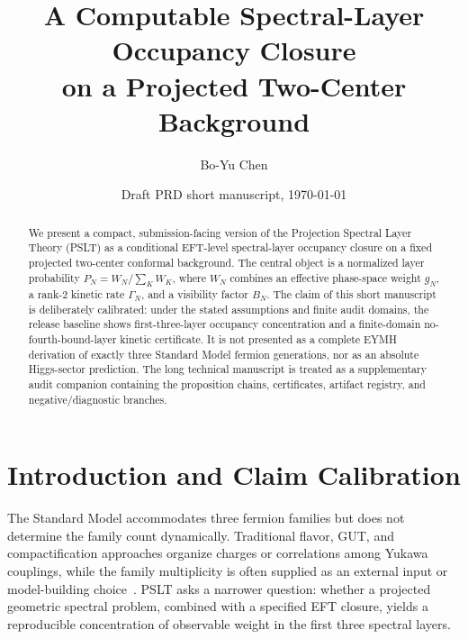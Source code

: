 \documentclass[aps,prd,onecolumn,notitlepage,nofootinbib,superscriptaddress,11pt,floatfix]{revtex4-2}
\begin{document}
\title{\Large\bf \texorpdfstring{A Computable Spectral-Layer Occupancy Closure\\ on a Projected Two-Center Background}{A Computable Spectral-Layer Occupancy Closure on a Projected Two-Center Background}}

\author{Bo-Yu Chen}

\date{Draft PRD short manuscript, \today}

\begin{abstract}
We present a compact, submission-facing version of the Projection Spectral Layer Theory (PSLT) as a conditional EFT-level spectral-layer occupancy closure on a fixed projected two-center conformal background.
The central object is a normalized layer probability
\(P_N=W_N/\sum_K W_K\), where \(W_N\) combines an effective phase-space weight \(g_N\), a rank-2 kinetic rate \(\Gamma_N\), and a visibility factor \(B_N\).
The claim of this short manuscript is deliberately calibrated: under the stated assumptions and finite audit domains, the release baseline shows first-three-layer occupancy concentration and a finite-domain no-fourth-bound-layer kinetic certificate.
It is not presented as a complete EYMH derivation of exactly three Standard Model fermion generations, nor as an absolute Higgs-sector prediction.
The long technical manuscript is treated as a supplementary audit companion containing the proposition chains, certificates, artifact registry, and negative/diagnostic branches.
\end{abstract}

\maketitle

\section{Introduction and Claim Calibration}
\label{sec:intro}

The Standard Model accommodates three fermion families but does not determine the family count dynamically.
Traditional flavor, GUT, and compactification approaches organize charges or correlations among Yukawa couplings, while the family multiplicity is often supplied as an external input or model-building choice~\cite{Cabibbo1963,KobayashiMaskawa1973,MakiNakagawaSakata1962,FroggattNielsen1979,AltarelliFeruglio2010,Feruglio2015,CandelasHorowitzStromingerWitten1985,GeorgiGlashow1974,FritzschMinkowski1975,PatiSalam1974,GurseyRamondSikivie1976,Slansky1981}.
PSLT asks a narrower question: whether a projected geometric spectral problem, combined with a specified EFT closure, yields a reproducible concentration of observable weight in the first three spectral layers.
\end{document}
